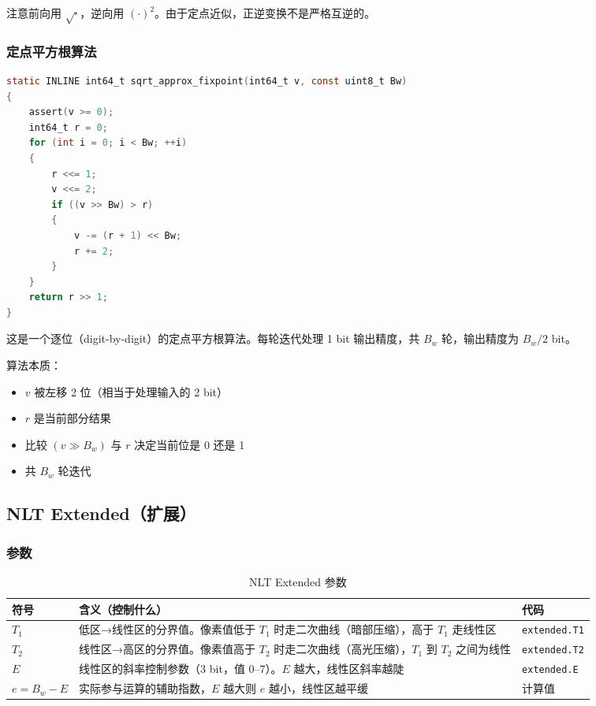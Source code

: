 注意前向用 $\sqrt{\cdot}$，逆向用 $(\cdot)^2$。由于定点近似，正逆变换不是严格互逆的。

\subsubsection{定点平方根算法}

\begin{lstlisting}[language=C,caption={定点平方根近似——\texttt{sqrt\_approx\_fixpoint()}（\texttt{nlt.c:85}）}]
static INLINE int64_t sqrt_approx_fixpoint(int64_t v, const uint8_t Bw)
{
    assert(v >= 0);
    int64_t r = 0;
    for (int i = 0; i < Bw; ++i)
    {
        r <<= 1;
        v <<= 2;
        if ((v >> Bw) > r)
        {
            v -= (r + 1) << Bw;
            r += 2;
        }
    }
    return r >> 1;
}
\end{lstlisting}

这是一个逐位（digit-by-digit）的定点平方根算法。每轮迭代处理 1 bit 输出精度，共 $B_w$ 轮，输出精度为 $B_w/2$ bit。

算法本质：
\begin{itemize}
  \item $v$ 被左移 2 位（相当于处理输入的 2 bit）
  \item $r$ 是当前部分结果
  \item 比较 $(v \gg B_w)$ 与 $r$ 决定当前位是 0 还是 1
  \item 共 $B_w$ 轮迭代
\end{itemize}

\subsection{NLT Extended（扩展）}

\subsubsection{参数}

\begin{table}[H]
\centering
\caption{NLT Extended 参数}
\label{tab:nlt-ext-params}
\begin{tabular}{@{}lp{5.5cm}l@{}}
\toprule
符号 & 含义（控制什么） & 代码 \\
\midrule
$T_1$ & 低区→线性区的分界值。像素值低于 $T_1$ 时走二次曲线（暗部压缩），高于 $T_1$ 走线性区 & \texttt{extended.T1} \\
$T_2$ & 线性区→高区的分界值。像素值高于 $T_2$ 时走二次曲线（高光压缩），$T_1$ 到 $T_2$ 之间为线性 & \texttt{extended.T2} \\
$E$ & 线性区的斜率控制参数（3 bit，值 0--7）。$E$ 越大，线性区斜率越陡 & \texttt{extended.E} \\
$e = B_w - E$ & 实际参与运算的辅助指数，$E$ 越大则 $e$ 越小，线性区越平缓 & 计算值 \\
\bottomrule
\end{tabular}
\end{table}

